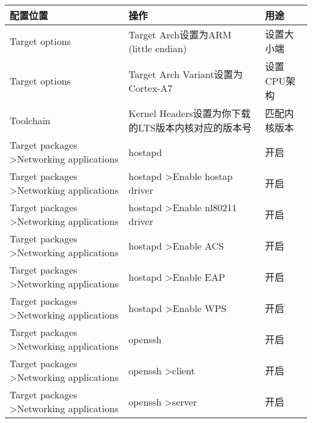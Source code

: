 \documentclass[lang=cn,newtx,10pt,scheme=chinese]{elegantbook}
\begin{document}
\begin{table}[ht]
\begin{adjustbox}{width=1\textwidth}
\begin{tabular}{|l|l|l|}
\hline
配置位置                                                    & 操作                                                & 用途                        \\
\hline
Target options                                             & Target Arch设置为ARM (little endian)                & 设置大小端                     \\
Target options                                             & Target Arch Variant设置为Cortex-A7                  & 设置CPU架构                   \\
Toolchain                                                  & Kernel Headers设置为你下载的LTS版本内核对应的版本号      & 匹配内核版本                    \\
Target packages \textgreater Networking applications       & hostapd                                            & 开启                        \\
Target packages \textgreater Networking applications       & hostapd \textgreater Enable hostap driver          & 开启                        \\
Target packages \textgreater Networking applications       & hostapd \textgreater Enable nl80211 driver         & 开启                        \\
Target packages \textgreater Networking applications       & hostapd \textgreater Enable ACS                    & 开启                        \\
Target packages \textgreater Networking applications       & hostapd \textgreater Enable EAP                    & 开启                        \\
Target packages \textgreater Networking applications       & hostapd \textgreater Enable WPS                    & 开启                        \\
Target packages \textgreater Networking applications       & openssh                                            & 开启                        \\
Target packages \textgreater Networking applications       & openssh \textgreater client                        & 开启                        \\
Target packages \textgreater Networking applications       & openssh \textgreater server                        & 开启                        \\

\end{tabular}
\end{adjustbox}
\end{table}
\end{document}
